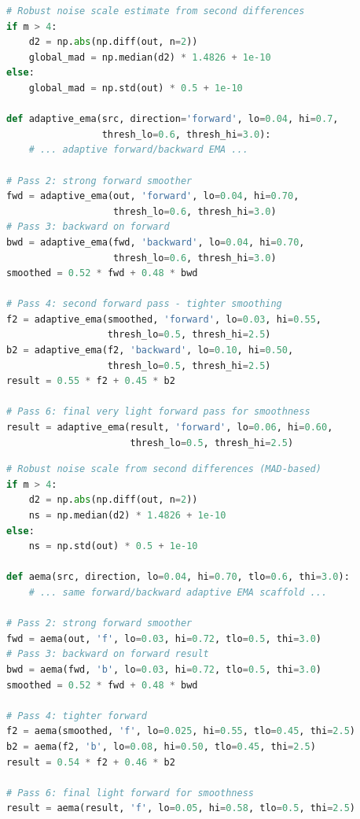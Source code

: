 \begin{lstlisting}[language=Python,caption={Abridged excerpt of the spawned shared-derived scaffold for the step-changes task.},label={lst:emosta-step-spawn}]
# Robust noise scale estimate from second differences
if m > 4:
    d2 = np.abs(np.diff(out, n=2))
    global_mad = np.median(d2) * 1.4826 + 1e-10
else:
    global_mad = np.std(out) * 0.5 + 1e-10

def adaptive_ema(src, direction='forward', lo=0.04, hi=0.7,
                 thresh_lo=0.6, thresh_hi=3.0):
    # ... adaptive forward/backward EMA ...

# Pass 2: strong forward smoother
fwd = adaptive_ema(out, 'forward', lo=0.04, hi=0.70,
                   thresh_lo=0.6, thresh_hi=3.0)
# Pass 3: backward on forward
bwd = adaptive_ema(fwd, 'backward', lo=0.04, hi=0.70,
                   thresh_lo=0.6, thresh_hi=3.0)
smoothed = 0.52 * fwd + 0.48 * bwd

# Pass 4: second forward pass - tighter smoothing
f2 = adaptive_ema(smoothed, 'forward', lo=0.03, hi=0.55,
                  thresh_lo=0.5, thresh_hi=2.5)
b2 = adaptive_ema(f2, 'backward', lo=0.10, hi=0.50,
                  thresh_lo=0.5, thresh_hi=2.5)
result = 0.55 * f2 + 0.45 * b2

# Pass 6: final very light forward pass for smoothness
result = adaptive_ema(result, 'forward', lo=0.06, hi=0.60,
                      thresh_lo=0.5, thresh_hi=2.5)
\end{lstlisting}

\begin{lstlisting}[language=Python,caption={Abridged excerpt of the task-specific retuning after EMO-STA adaptation on the step-changes task.},label={lst:emosta-step-adapt}]
# Robust noise scale from second differences (MAD-based)
if m > 4:
    d2 = np.abs(np.diff(out, n=2))
    ns = np.median(d2) * 1.4826 + 1e-10
else:
    ns = np.std(out) * 0.5 + 1e-10

def aema(src, direction, lo=0.04, hi=0.70, tlo=0.6, thi=3.0):
    # ... same forward/backward adaptive EMA scaffold ...

# Pass 2: strong forward smoother
fwd = aema(out, 'f', lo=0.03, hi=0.72, tlo=0.5, thi=3.0)
# Pass 3: backward on forward result
bwd = aema(fwd, 'b', lo=0.03, hi=0.72, tlo=0.5, thi=3.0)
smoothed = 0.52 * fwd + 0.48 * bwd

# Pass 4: tighter forward
f2 = aema(smoothed, 'f', lo=0.025, hi=0.55, tlo=0.45, thi=2.5)
b2 = aema(f2, 'b', lo=0.08, hi=0.50, tlo=0.45, thi=2.5)
result = 0.54 * f2 + 0.46 * b2

# Pass 6: final light forward for smoothness
result = aema(result, 'f', lo=0.05, hi=0.58, tlo=0.5, thi=2.5)
\end{lstlisting}

